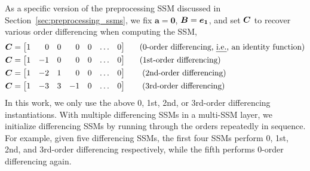 As a specific version of the preprocessing SSM discussed in Section~\ref{sec:preprocessing_ssms}, we fix $\boldsymbol{a} = \boldsymbol{0}$, $\boldsymbol{B} = \boldsymbol{e_1}$, and set $\boldsymbol{C}$ to recover various order differencing when computing the SSM, \ie{}
\begin{align}
    \zC &= 
    \begin{bmatrix}
    1 & \phantom{-}0 & 0 & \phantom{-}0 & 0 & \ldots & 0 \\
    \end{bmatrix}
    \;\;\;\;\;\;
    \begin{matrix}
    \hfill\text{(0-order differencing, \ie{} an identity function)} \\
    \end{matrix} \\
    \zC &= 
    \begin{bmatrix}
    1 & -1 & 0 & \phantom{-}0 & 0 & \ldots & 0 \\
    \end{bmatrix}
    \;\;\;\;\;\;
    \begin{matrix}
    \hfill\text{(1st-order differencing)} \\
    \end{matrix} \\
    \zC &= 
    \begin{bmatrix}
    1 & -2 & 1 & \phantom{-}0 & 0 & \ldots & 0 \\
    \end{bmatrix}
    \;\;\;\;\;\;
    \begin{matrix}
    \hfill\text{ (2nd-order differencing)} \\
    \end{matrix} \\
    \zC &= 
    \begin{bmatrix}
    1 & -3 & 3 & -1 & 0 & \ldots & 0 \\
    \end{bmatrix}
    \;\;\;\;\;\;
    \begin{matrix}
    \hfill\text{ (3rd-order differencing)} \\
    \end{matrix}
\end{align}
 In this work, we only use the above 0, 1st, 2nd, or 3rd-order differencing instantiations. With multiple differencing SSMs in a multi-SSM \ourmethod{} layer, we initialize differencing SSMs by running through the orders repeatedly in sequence. For example, given five differencing SSMs, the first four SSMs perform 0, 1st, 2nd, and 3rd-order differencing respectively, while the fifth performs 0-order differencing again.

